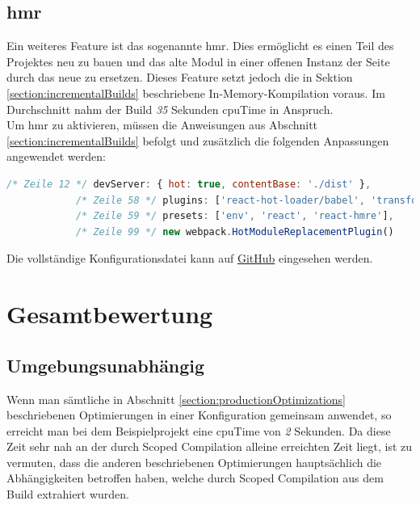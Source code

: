 \documentclass[11pt]{report}
\begin{document}
    		\subsection{\Gls{hmr}}
    			Ein weiteres Feature ist das sogenannte \Gls{hmr}. Dies ermöglicht es einen Teil des Projektes neu zu bauen und das alte Modul in einer offenen Instanz der Seite durch das neue zu ersetzen. Dieses Feature setzt jedoch die in Sektion \ref{section:incrementalBuilds} beschriebene In-Memory-Kompilation voraus. Im Durchschnitt nahm der Build \emph{35} Sekunden \Gls{cpuTime} in Anspruch.\\
    			Um \Gls{hmr} zu aktivieren, müssen die Anweisungen aus Abschnitt \ref{section:incrementalBuilds} befolgt und zusätzlich die folgenden Anpassungen angewendet werden:\\
    			\begin{center}
		        	\begin{lstlisting}[language=JavaScript]
			/* Zeile 12 */ devServer: { hot: true, contentBase: './dist' },
			/* Zeile 58 */ plugins: ['react-hot-loader/babel', 'transform-class-properties'],
			/* Zeile 59 */ presets: ['env', 'react', 'react-hmre'],
			/* Zeile 99 */ new webpack.HotModuleReplacementPlugin()
		        	\end{lstlisting}
	        	\end{center}
    			Die vollständige Konfigurationsdatei kann auf \href{https://github.com/TexNAK/WebBundlerOptimization/commit/4a1cadbe86cc305bafeb9f7d56733fc90b0f514a#diff-1fb5683b1e7adbcee273b7f9f9a08a22}{GitHub} eingesehen werden.

		\section{Gesamtbewertung}
			\subsection{Umgebungsunabhängig}
				Wenn man sämtliche in Abschnitt \ref{section:productionOptimizations} beschriebenen Optimierungen in einer Konfiguration gemeinsam anwendet, so erreicht man bei dem Beispielprojekt eine \Gls{cpuTime} von \emph{2} Sekunden. Da diese Zeit sehr nah an der durch Scoped Compilation alleine erreichten Zeit liegt, ist zu vermuten, dass die anderen beschriebenen Optimierungen hauptsächlich die Abhängigkeiten betroffen haben, welche durch Scoped Compilation aus dem Build extrahiert wurden.
\end{document}
